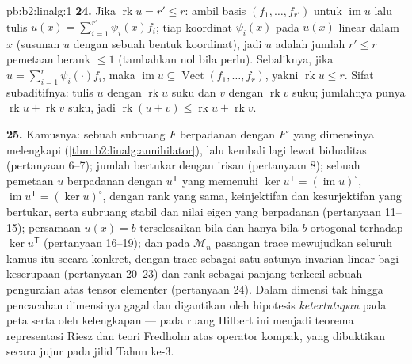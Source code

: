 \begin{solution}{pb:b2:linalg:1}
\textbf{24.} Jika $\operatorname{rk} u = r' \leq r$: ambil basis
$(f_1, \dots, f_{r'})$ untuk $\operatorname{im} u$ lalu tulis $u(x)
= \sum_{i=1}^{r'} \psi_i(x) f_i$; tiap koordinat $\psi_i(x)$ pada
$u(x)$ linear dalam $x$ (susunan $u$ dengan sebuah bentuk
koordinat), jadi $u$ adalah jumlah $r' \leq r$ pemetaan berank $\leq1$
(tambahkan nol bila perlu). Sebaliknya, jika $u = \sum_{i=1}^r
\psi_i(\cdot)f_i$, maka $\operatorname{im} u \subseteq
\operatorname{Vect}(f_1, \dots, f_r)$, yakni $\operatorname{rk} u \leq
r$. Sifat subaditifnya: tulis $u$ dengan $\operatorname{rk} u$ suku dan
$v$ dengan $\operatorname{rk} v$ suku; jumlahnya punya
$\operatorname{rk} u + \operatorname{rk} v$ suku, jadi
$\operatorname{rk}(u + v) \leq \operatorname{rk} u + \operatorname{rk} v$.

\textbf{25.} Kamusnya: sebuah subruang $F$ berpadanan dengan
$F^\circ$ yang dimensinya melengkapi
(\cref{thm:b2:linalg:annihilator}), lalu kembali lagi lewat bidualitas
(pertanyaan 6--7); jumlah bertukar dengan irisan (pertanyaan 8);
sebuah pemetaan $u$ berpadanan dengan $u^{\mathsf T}$ yang memenuhi
$\ker u^{\mathsf T} = (\operatorname{im}u)^\circ$,
$\operatorname{im}u^{\mathsf T} = (\ker u)^\circ$, dengan rank yang
sama, keinjektifan dan kesurjektifan yang bertukar, serta subruang
stabil dan nilai eigen yang berpadanan (pertanyaan 11--15); persamaan
$u(x) = b$ terselesaikan bila dan hanya bila $b$ ortogonal terhadap
$\ker u^{\mathsf T}$ (pertanyaan 16--19); dan pada $\mathcal{M}_n$
pasangan trace mewujudkan seluruh kamus itu secara konkret, dengan
trace sebagai satu-satunya invarian linear bagi keserupaan
(pertanyaan 20--23) dan rank sebagai panjang terkecil sebuah
penguraian atas tensor elementer (pertanyaan 24). Dalam dimensi tak
hingga pencacahan dimensinya gagal dan digantikan oleh hipotesis
\emph{ketertutupan} pada peta serta oleh kelengkapan --- pada ruang
Hilbert ini menjadi teorema representasi Riesz dan teori Fredholm atas
operator kompak, yang dibuktikan secara jujur pada jilid Tahun ke-3.

\end{solution}
